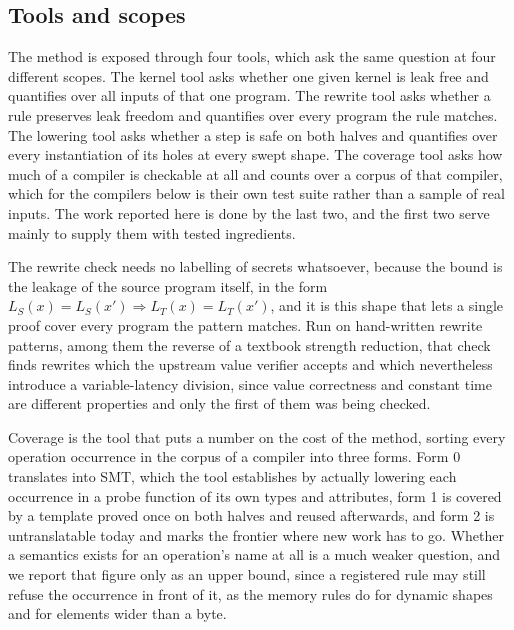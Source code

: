 \subsection{Tools and scopes}
\label{sec:verify:tools}
The method is exposed through four tools, which ask the same question at four different scopes.
The kernel tool asks whether one given kernel is leak free and quantifies over all inputs of that one program.
The rewrite tool asks whether a rule preserves leak freedom and quantifies over every program the rule matches.
The lowering tool asks whether a step is safe on both halves and quantifies over every instantiation of its holes at every swept shape.
The coverage tool asks how much of a compiler is checkable at all and counts over a corpus of that compiler, which for the compilers below is their own test suite rather than a sample of real inputs.
The work reported here is done by the last two, and the first two serve mainly to supply them with tested ingredients.

The rewrite check needs no labelling of secrets whatsoever, because the bound is the leakage of the source program itself, in the form $L_S(x) = L_S(x') \Rightarrow L_T(x) = L_T(x')$, and it is this shape that lets a single proof cover every program the pattern matches.
Run on hand-written rewrite patterns, among them the reverse of a textbook strength reduction, that check finds rewrites which the upstream value verifier accepts and which nevertheless introduce a variable-latency division, since value correctness and constant time are different properties and only the first of them was being checked.

Coverage is the tool that puts a number on the cost of the method, sorting every operation occurrence in the corpus of a compiler into three forms.
Form 0 translates into SMT, which the tool establishes by actually lowering each occurrence in a probe function of its own types and attributes, form 1 is covered by a template proved once on both halves and reused afterwards, and form 2 is untranslatable today and marks the frontier where new work has to go.
Whether a semantics exists for an operation's name at all is a much weaker question, and we report that figure only as an upper bound, since a registered rule may still refuse the occurrence in front of it, as the memory rules do for dynamic shapes and for elements wider than a byte.
